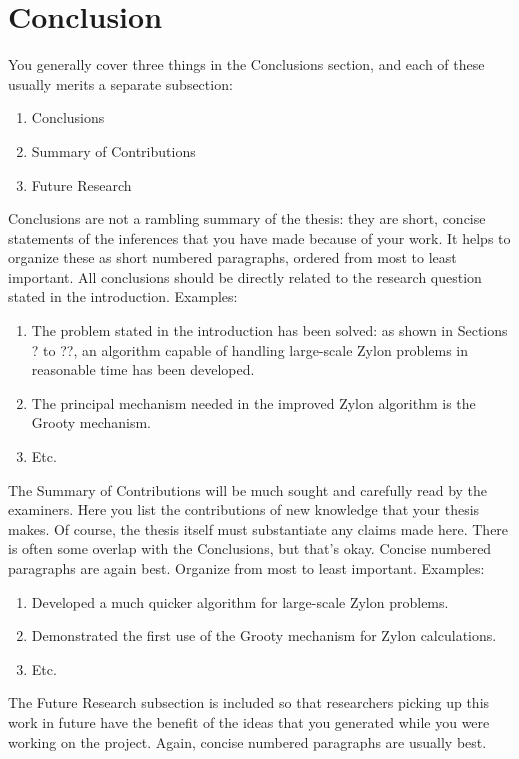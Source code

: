 \chapter{Conclusion}\label{chap:conclusion}


You generally cover three things in the Conclusions section, and each of these usually merits a separate subsection:

\begin{enumerate}
	\item Conclusions
	\item Summary of Contributions
	\item Future Research
\end{enumerate}

Conclusions are not a rambling summary of the thesis: they are short, concise statements of the inferences that you have made because of your work. It helps to organize these as short numbered paragraphs, ordered from most to least important. All conclusions should be directly related to the research question stated in the introduction. Examples:

\begin{enumerate}
	\item The problem stated in the introduction has been solved: as shown in Sections ? to ??, an algorithm capable of handling large-scale Zylon problems in reasonable time has been developed.
	\item The principal mechanism needed in the improved Zylon algorithm is the Grooty mechanism.
	\item Etc.
\end{enumerate}

The Summary of Contributions will be much sought and carefully read by the examiners. Here you list the contributions of new knowledge that your thesis makes. Of course, the thesis itself must substantiate any claims made here. There is often some overlap with the Conclusions, but that's okay. Concise numbered paragraphs are again best. Organize from most to least important. Examples:

\begin{enumerate}
	\item Developed a much quicker algorithm for large-scale Zylon problems.
	\item Demonstrated the first use of the Grooty mechanism for Zylon calculations.
	\item Etc.
\end{enumerate}

The Future Research subsection is included so that researchers picking up this work in future have the benefit of the ideas that you generated while you were working on the project. Again, concise numbered paragraphs are usually best. 